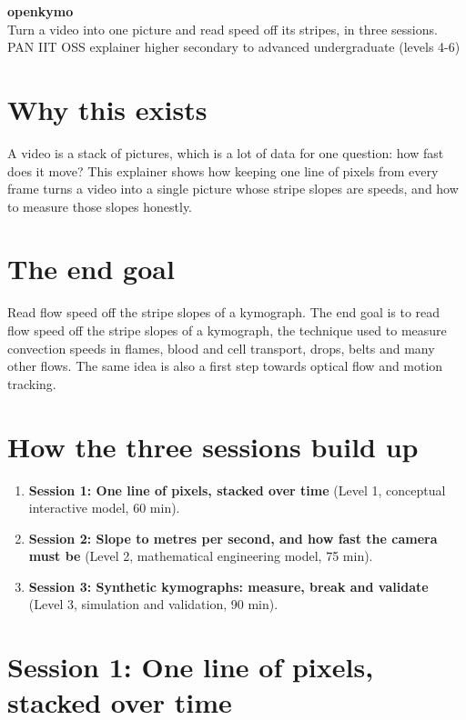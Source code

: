 \documentclass[11pt,a4paper]{article}
\begin{document}
\begin{center}{\LARGE\bfseries openkymo}\\[0.4em]{\large Turn a video into one picture and read speed off its stripes, in three sessions.}\\[0.2em]\small PAN IIT OSS explainer \textbullet{} higher secondary to advanced undergraduate (levels 4-6)\end{center}

\section*{Why this exists}
A video is a stack of pictures, which is a lot of data for one question: how fast does it move? This explainer shows how keeping one line of pixels from every frame turns a video into a single picture whose stripe slopes are speeds, and how to measure those slopes honestly.

\section*{The end goal}
Read flow speed off the stripe slopes of a kymograph. The end goal is to read flow speed off the stripe slopes of a kymograph, the technique used to measure convection speeds in flames, blood and cell transport, drops, belts and many other flows. The same idea is also a first step towards optical flow and motion tracking.

\section*{How the three sessions build up}
\begin{enumerate}[nosep]
\item \textbf{Session 1: One line of pixels, stacked over time} (Level 1, conceptual interactive model, 60 min).
\item \textbf{Session 2: Slope to metres per second, and how fast the camera must be} (Level 2, mathematical engineering model, 75 min).
\item \textbf{Session 3: Synthetic kymographs: measure, break and validate} (Level 3, simulation and validation, 90 min).
\end{enumerate}

\section{Session 1: One line of pixels, stacked over time}
\end{document}
